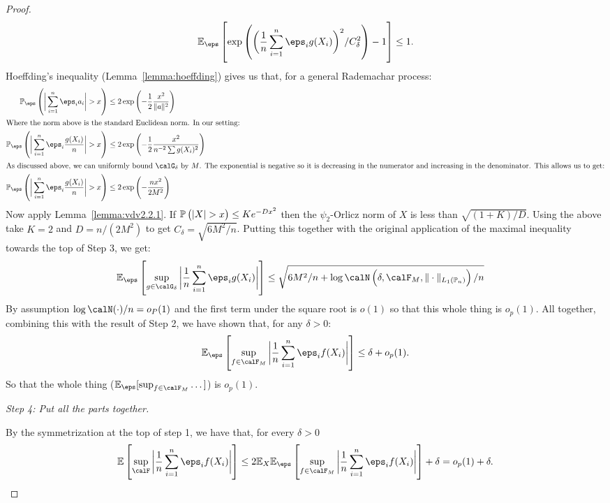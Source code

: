 \begin{proof}
	 \[
		 \E_\eps\left[\exp\left(\bigg(\frac{1}{n}\sum_{i=1}^n \eps_ig(X_i)\bigg)^2/C_\delta^2\right)-1\right]\leq 1
	.\] 
	Hoeffding's inequality (Lemma~\ref{lemma:hoeffding}) gives us that, for a general Rademachar process:
	\begin{align*}
		\P_\eps\left(\bigg|\sum_{i=1}^n \eps_ia_i\bigg|>x\right) &\leq 2\exp\left(-\frac{1}{2}\frac{x^2}{\|a\|^2}\right)\\
		\intertext{Where the norm above is the standard Euclidean norm. In our setting:}
		\P_\eps\left(\bigg|\sum_{i=1}^n \eps_i\frac{g(X_i)}{n} \bigg| > x\right) &\leq 2\exp\left(-\frac{1}{2}\frac{x^2}{n^{-2}\sum g(X_i)^2} \right)\\
		\intertext{As discussed above, we can uniformly bound  \(\calG_\delta\) by  \(M\). The exponential is negative so it is decreasing in the numerator and increasing in the denominator. This allows us to get:} 
		\P_\eps\left(\bigg|\sum_{i=1}^n \eps_i\frac{g(X_i)}{n} \bigg| > x\right) &\leq 2\exp\left(-\frac{n x^2}{2M^2} \right)
	\end{align*}
	Now apply Lemma~\ref{lemma:vdv2.2.1}. If \(\P\left(|X|>x\right)\leq Ke^{-Dx^2}\) then the \(\psi_2\)-Orlicz norm of \(X\) is less than  \(\sqrt{(1+K)/D}\). Using the above take \(K=2\) and \(D = n/(2M^2)\) to get \(C_\delta = \sqrt{6M^2/n}\). Putting this together with the original application of the maximal inequality towards the top of Step 3, we get:
	\begin{align*}
		\E_\eps\left[\sup_{g\in\calG_\delta}\bigg|\frac{1}{n}\sum_{i=1}^n \eps_ig(X_i)\bigg|\right]&\leq \sqrt{6M^2/n + \log\calN\left(\delta,\calF_M,\|\cdot\|_{L_1(\P_n)}\right)/n}
	\end{align*}
	By assumption \(\log\calN(\cdot)/n = o_P(1)\) and the first term under the square root is \(o(1)\) so that this whole thing is \(o_p(1)\). All together, combining this with the result of Step 2, we have shown that, for any \(\delta > 0\):
	\[
		\E_\eps\left[\sup_{f\in\calF_M}\bigg|\frac{1}{n}\sum_{i=1}^n \eps_if(X_i)\bigg|\right] \leq \delta + o_p(1) 
	.\] 
	So that the whole thing (\(\E_\eps[\sup_{f\in\calF_M}\dots]\)) is \(o_p(1)\). 

	\textit{Step 4: Put all the parts together.}
	
	By the symmetrization at the top of step 1, we have that, for every \(\delta > 0\)
	 \[
		 \E\left[\sup_{\calF}\bigg|\frac{1}{n}\sum_{i=1}^n \eps_if(X_i) \bigg|\right] \leq  2\E_X\E_\eps\left[\sup_{f\in\calF_M}\bigg|\frac{1}{n}\sum_{i=1}^n \eps_if(X_i)\bigg|\right] + \delta = o_p(1) + \delta
	.\] 

\end{proof}



